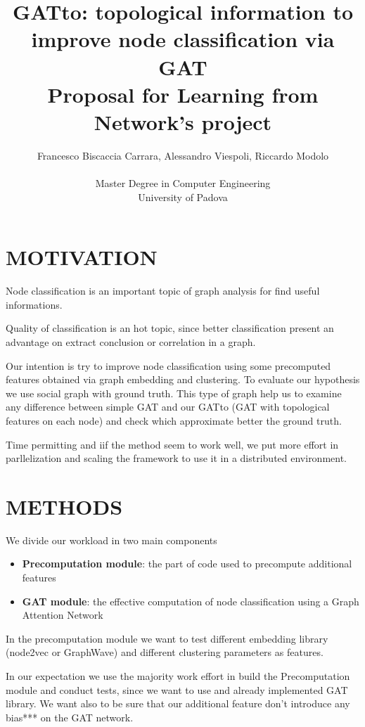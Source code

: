 \documentclass[12pt,conference]{ieeeconf} %
\title{GATto: topological information to improve node classification via GAT\\
\large Proposal for Learning from Network's project \\}
\author{Francesco Biscaccia Carrara, Alessandro Viespoli, Riccardo Modolo %
\\\\ Master Degree in Computer Engineering \\
University of Padova \\
}
\begin{document}
\maketitle
\thispagestyle{plain}
\pagestyle{plain}

\section{MOTIVATION} 

Node classification is an important topic of graph analysis for find useful informations.\par
Quality of classification is an hot topic, since better classification present an advantage on extract conclusion or correlation in a graph.\par
Our intention is try to improve node classification using some precomputed features obtained via graph embedding and clustering.
To evaluate our hypothesis we use social graph with ground truth.
This type of graph help us to examine any difference between simple GAT and our GATto (GAT with topological features on each node) and check which approximate better the ground truth. \par

Time permitting and iif the method seem to work well, we put more effort in parllelization and scaling the framework to use it in a distributed environment.

\section{METHODS}

We divide our workload in two main components
\begin{itemize}
    \item{\textbf{Precomputation module}: the part of code used to precompute additional features}
    \item{\textbf{GAT module}: the effective computation of node classification using a Graph Attention Network }
\end{itemize}

In the precomputation module we want to test different embedding library (node2vec or GraphWave) and different clustering parameters as features.\par
In our expectation we use the majority work effort in build the Precomputation module and conduct tests, since we want to use and already implemented GAT library.
We want also to be sure that our additional feature don't introduce any bias*** on the GAT network. 
\end{document}
